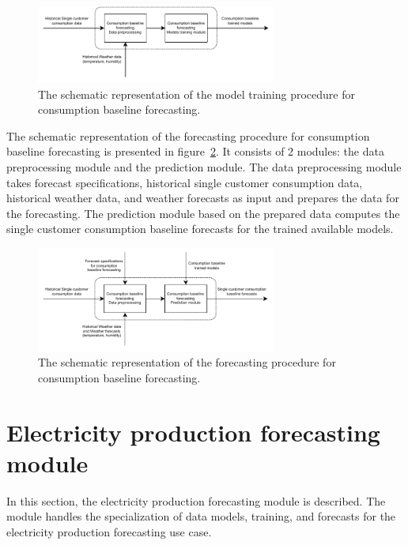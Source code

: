 \begin{figure}[H]
\centering
\includegraphics[width=0.7\textwidth]{images/system_model_training_baseline}
\caption{The schematic representation of the model training procedure for consumption baseline forecasting.}
\label{fig:modeltrainingbaseline}
\end{figure}

The schematic representation of the forecasting procedure for consumption baseline forecasting is presented in figure~\ref{fig:modelforecastingbaseline}.
It consists of 2 modules: the data preprocessing module and the prediction module.
The data preprocessing module takes forecast specifications, historical single customer consumption data, historical weather data, and weather forecasts as input and prepares the data for the forecasting.
The prediction module based on the prepared data computes the single customer consumption baseline forecasts for the trained available models.

\begin{figure}[H]
\centering
\includegraphics[width=0.7\textwidth]{images/system_model_forecasting_baseline}
\caption{The schematic representation of the forecasting procedure for consumption baseline forecasting.}
\label{fig:modelforecastingbaseline}
\end{figure}


\section{Electricity production forecasting module}
\label{sec:productionmodel}
\vspace{0.2 cm}

In this section, the electricity production forecasting module is described.
The module handles the specialization of data models, training, and forecasts for the electricity production forecasting use case.


